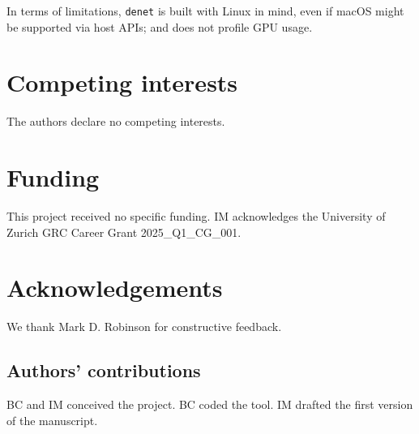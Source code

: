 \documentclass[10pt]{article}
\newcommand{\beginsupplement}{%
        \setcounter{table}{0}
        \renewcommand{\thetable}{S\arabic{table}}%
        \setcounter{figure}{0}
        \renewcommand{\thefigure}{S\arabic{figure}}%
        \setcounter{section}{0}
        \renewcommand{\thesection}{S\arabic{section}}%
      }
\begin{document}
In terms of limitations, \texttt{denet} is built with Linux in mind, even if macOS might be supported via host APIs; and does not profile GPU usage.

\section*{Competing interests}

The authors declare no competing interests.

\section*{Funding}

This project received no specific funding. IM acknowledges the University of Zurich GRC Career Grant 2025\_Q1\_CG\_001.

\section*{Acknowledgements}

We thank Mark D. Robinson for constructive feedback.

\subsection*{Authors' contributions}

BC and IM conceived the project. BC coded the tool. IM drafted the first version of the manuscript.




\clearpage


\end{document}
